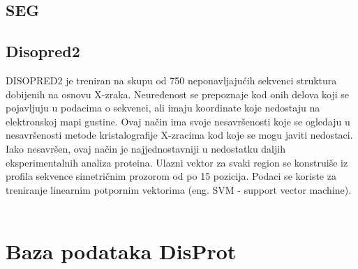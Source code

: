 \subsection{SEG}



\subsection{Disopred2}

DISOPRED2 je treniran na skupu od 750 neponavljajućih sekvenci struktura dobijenih na osnovu X-zraka. Neuređenost se prepoznaje kod onih delova koji se pojavljuju u podacima o sekvenci, ali imaju koordinate koje nedostaju na elektronskoj mapi gustine. Ovaj način ima svoje nesavršenosti koje se ogledaju u nesavršenosti metode kristalografije X-zracima kod koje se mogu javiti nedostaci. Iako nesavršen, ovaj način je najjednostavniji u nedostatku daljih eksperimentalnih analiza proteina. Ulazni vektor za svaki region se konstruiše iz profila sekvence simetričnim prozorom od po 15 pozicija. Podaci se koriste za treniranje linearnim potpornim vektorima (eng. SVM - support vector machine). ~\cite{DISOPRED}


\section{Baza podataka DisProt}
